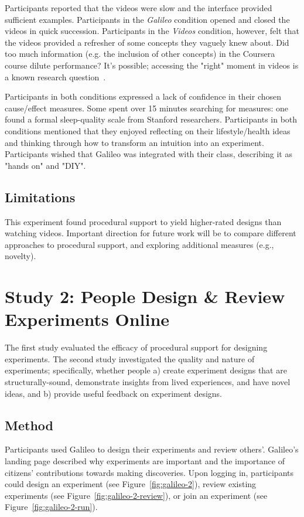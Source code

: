 Participants reported that the videos were slow and the interface provided sufficient examples. Participants in the \textit{Galileo} condition opened and closed the videos in quick succession. Participants in the \textit{Videos} condition, however, felt that the videos provided a refresher of some concepts they vaguely knew about. Did too much information (e.g. the inclusion of other concepts) in the Coursera course dilute performance? It's possible; accessing the "right" moment in videos is a known research question~\cite{kim2014crowdsourcing}. 

Participants in both conditions expressed a lack of confidence in their chosen cause/effect measures. Some spent over 15 minutes searching for measures: one found a formal sleep-quality scale from Stanford researchers. Participants in both conditions mentioned that they enjoyed reflecting on their lifestyle/health ideas and thinking through how to transform an intuition into an experiment. Participants wished that Galileo was integrated with their class, describing it as "hands on" and "DIY". 

\subsection*{Limitations}
This experiment found procedural support to yield higher-rated designs than watching videos. Important direction for future work will be to compare different approaches to procedural support, and exploring additional measures (e.g., novelty). 

\section{Study 2: People Design \& Review Experiments Online}
The first study evaluated the efficacy of procedural support for designing experiments. The second study investigated the quality and nature of experiments; specifically, whether people a) create experiment designs that are structurally-sound, demonstrate insights from lived experiences, and have novel ideas, and b) provide useful feedback on experiment designs. 

\subsection*{Method}
Participants used Galileo to design their experiments and review others'. Galileo's landing page described why experiments are important and the importance of citizens' contributions towards making discoveries. Upon logging in, participants could design an experiment (see Figure~\ref{fig:galileo-2}), review existing experiments (see Figure~\ref{fig:galileo-2-review}), or join an experiment (see Figure~\ref{fig:galileo-2-run}). 

